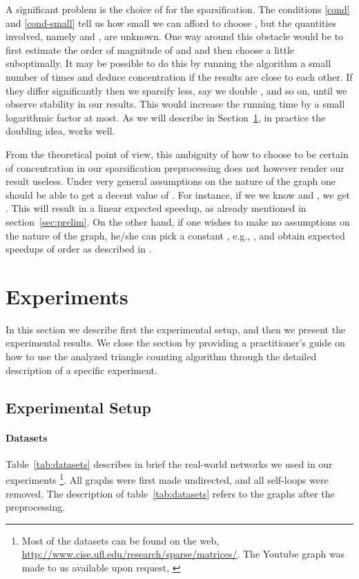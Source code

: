 \documentclass{llncs}
\newcommand{\hide}[1]{}
\begin{document}
A significant problem is the choice of  for the sparsification. The conditions \eqref{cond} and \eqref{cond-small} tell us how small we can afford to choose , but the quantities involved, namely  and , are unknown. One way around this obstacle would be to first estimate the order of magnitude of  and  and then choose  a little suboptimally. It may be possible to do this by running the algorithm a small number of times and deduce concentration if the results are close to each other. If they differ significantly then we sparsify less, say we double , and so on, until we observe stability in our results. This would increase the running time by a small logarithmic factor at most. As we will describe in Section~\ref{sec:experiments}, in practice the doubling  idea, works well. \hide{since concentration is achieved for small  values, ranging from  to . Notice the corresponding expected speedups if one uses a simple counting algorithm like the node iterator \cite{Tsourakakiskdd09} are  2,500 to 40,000.}

From the theoretical point of view, this ambiguity of how to choose  to be certain of concentration in our sparsification preprocessing does not however render our result useless. Under very general assumptions on the nature of the graph one should be able to get a decent value of . For instance, if we we know  and  , we get . This will result in a linear  expected speedup, as already mentioned in section~\ref{sec:prelim}.
On the other hand, if one wishes to make no assumptions on the nature of the graph, he/she can pick a constant , e.g., , and obtain expected speedups of order  as described in \cite{Tsourakakiskdd09}. 


\section{Experiments}
\label{sec:experiments}

In this section we describe first the experimental setup, and then we present the experimental results. 
We close the section by providing a practitioner's guide on how to use the analyzed triangle counting
algorithm through the detailed description of a specific experiment.


\subsection{Experimental Setup}

\paragraph{Datasets}
Table~\ref{tab:datasets} describes in brief the real-world networks we used in our experiments \footnote{Most of the datasets
can be found on the web, \url{http://www.cise.ufl.edu/research/sparse/matrices/}. The Youtube graph was made to us available 
upon request, \cite{mislove}}.
All graphs were first made undirected, and all self-loops were removed. The description 
of table~\ref{tab:datasets} refers to the graphs after the preprocessing. 
\end{document}
